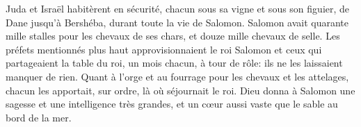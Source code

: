 Juda et Israël habitèrent en sécurité, chacun sous sa vigne et sous son figuier,
	de Dane jusqu’à Bershéba, durant toute la vie de Salomon.
Salomon avait quarante mille stalles pour les chevaux de ses chars,
	et douze mille chevaux de selle.
Les préfets mentionnés plus haut
		approvisionnaient le roi Salomon et ceux qui partageaient la table du roi,
	un mois chacun, à tour de rôle:
	ils ne les laissaient manquer de rien.
Quant à l’orge et au fourrage pour les chevaux et les attelages,
	chacun les apportait, sur ordre, là où séjournait le roi.
Dieu donna à Salomon une sagesse et une intelligence très grandes,
	et un cœur aussi vaste que le sable au bord de la mer.
